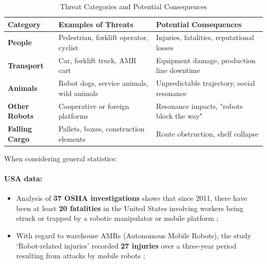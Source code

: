 \begin{table}[h]
    \centering
    \caption{Threat Categories and Potential Consequences}
    \label{tab:threats_consequences}
    \begin{tabular}{|>{\raggedright\arraybackslash}m{2.5cm}|>{\raggedright\arraybackslash}m{6cm}|>{\raggedright\arraybackslash}m{6.5cm}|}
        \hline
        \textbf{Category} & \textbf{Examples of Threats} & \textbf{Potential Consequences} \\ \hline
        \textbf{People} & Pedestrian, forklift operator, cyclist & Injuries, fatalities, reputational losses \\ \hline
        \textbf{Transport} & Car, forklift truck, AMR cart & Equipment damage, production line downtime \\ \hline
        \textbf{Animals} & Robot dogs, service animals, wild animals & Unpredictable trajectory, social resonance \\ \hline
        \textbf{Other Robots} & Cooperative or foreign platforms & Resonance impacts, "robots block the way" \\ \hline
        \textbf{Falling Cargo} & Pallets, boxes, construction elements & Route obstruction, shelf collapse \\ \hline
    \end{tabular}
\end{table}
When considering general statistics:
\paragraph{USA data:}
\begin{itemize}
     \item Analysis of \textbf{37 OSHA investigations} shows that since 2011, there have been at least \textbf{20 fatalities} in the United States involving workers being struck or trapped by a robotic manipulator or mobile platform \citep{osha_robot_accidents};
    \item With regard to warehouse AMRs (Autonomous Mobile Robots), the study ‘Robot-related injuries’ recorded \textbf{27 injuries} over a three-year period resulting from attacks by mobile robots \citep{SANDERS2024104324};
\end{itemize}

